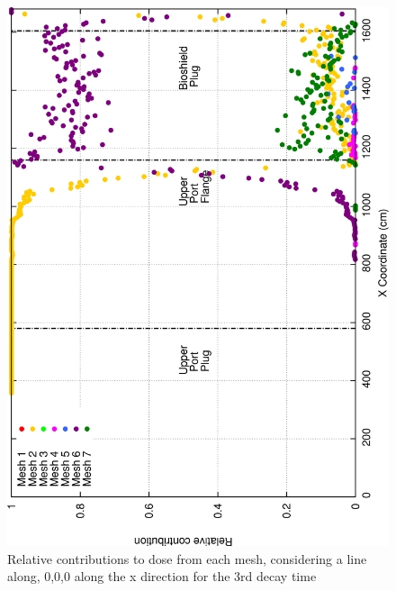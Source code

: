 \documentclass[12pt]{article}
\begin{document}
\begin{figure}[ht!]
\centering
\includegraphics[clip,scale=0.25]{../plots/crosstalk/b4c/up/dc3_rel.png}
\caption{Relative contributions to dose from each mesh, considering a line along, 0,0,0 along the x direction for the 3rd decay time}
\label{fig:b4c_ct_up_dc3_rel}
\end{figure}
\newpage
\clearpage
\end{document}
